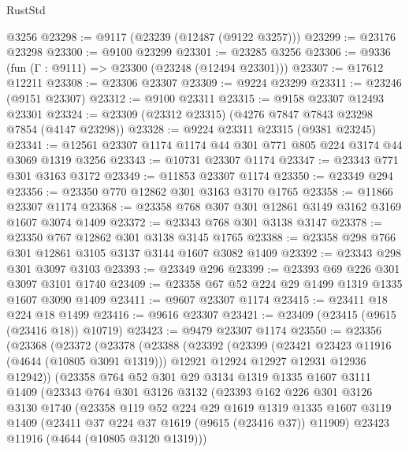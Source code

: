\begin{lexlean}{RustStd}
\begin{coremodule}
    @3256
@23298 := @9117 (@23239 (@12487 (@9122 @3257)))
@23299 := @23176 @23298
@23300 := @9100 @23299
@23301 := @23285 @3256
@23306 := @9336 (fun (Γ : @9111) => @23300 (@23248 (@12494 @23301)))
@23307 := @17612 @12211
@23308 := @23306 @23307
@23309 := @9224 @23299
@23311 := @23246 (@9151 @23307)
@23312 := @9100 @23311
@23315 := @9158 @23307 @12493 @23301
@23324 := @23309 (@23312 @23315) (@4276 @7847 @7843 @23298 @7854 (@4147 @23298))
@23328 := @9224 @23311 @23315 (@9381 @23245)
@23341 := @12561 @23307 @1174 @1174 @44 @301 @771 @805 @224 @3174 @44 @3069 @1319 @3256
@23343 := @10731 @23307 @1174
@23347 := @23343 @771 @301 @3163 @3172
@23349 := @11853 @23307 @1174
@23350 := @23349 @294
@23356 := @23350 @770 @12862 @301 @3163 @3170 @1765
@23358 := @11866 @23307 @1174
@23368 := @23358 @768 @307 @301 @12861 @3149 @3162 @3169 @1607 @3074 @1409
@23372 := @23343 @768 @301 @3138 @3147
@23378 := @23350 @767 @12862 @301 @3138 @3145 @1765
@23388 := @23358 @298 @766 @301 @12861 @3105 @3137 @3144 @1607 @3082 @1409
@23392 := @23343 @298 @301 @3097 @3103
@23393 := @23349 @296
@23399 := @23393 @69 @226 @301 @3097 @3101 @1740
@23409 := @23358 @67 @52 @224 @29 @1499 @1319 @1335 @1607 @3090 @1409
@23411 := @9607 @23307 @1174
@23415 := @23411 @18 @224 @18 @1499
@23416 := @9616 @23307
@23421 := @23409 (@23415 (@9615 (@23416 @18)) @10719)
@23423 := @9479 @23307 @1174
@23550 := @23356
    (@23368
      (@23372
        (@23378
          (@23388
            (@23392
              (@23399
                (@23421 @23423 @11916 (@4644 (@10805 @3091 @1319)))
                @12921
                @12924
                @12927
                @12931
                @12936
                @12942))
            (@23358
              @764
              @52
              @301
              @29
              @3134
              @1319
              @1335
              @1607
              @3111
              @1409
              (@23343
                @764
                @301
                @3126
                @3132
                (@23393
                  @162
                  @226
                  @301
                  @3126
                  @3130
                  @1740
                  (@23358
                    @119
                    @52
                    @224
                    @29
                    @1619
                    @1319
                    @1335
                    @1607
                    @3119
                    @1409
                    (@23411 @37 @224 @37 @1619 (@9615 (@23416 @37)) @11909)
                    @23423
                    @11916
                    (@4644 (@10805 @3120 @1319)))

\end{coremodule}
\end{lexlean}
